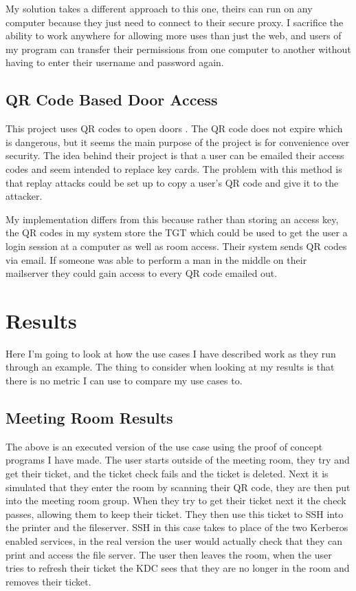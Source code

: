 \documentclass[]{report}   %
\begin{document}
My solution takes a different approach to this one, theirs can run on any computer because they just need to connect to their secure proxy. I sacrifice the ability to work anywhere for allowing more uses than just the web, and users of my program can transfer their permissions from one computer to another without having to enter their username and password again.

\subsection{QR Code Based Door Access}
This project uses QR codes to open doors \cite{QRRelated}. The QR code does not expire which is dangerous, but it seems the main purpose of the project is for convenience over security. The idea behind their project is that a user can be emailed their access codes and seem intended to replace key cards. The problem with this method is that replay attacks could be set up to copy a user's QR code and give it to the attacker.

My implementation differs from this because rather than storing an access key, the QR codes in my system store the TGT which could be used to get the user a login session at a computer as well as room access. Their system sends QR codes via email. If someone was able to perform a man in the middle on their mailserver they could gain access to every QR code emailed out.


\section{Results}
Here I'm going to look at how the use cases I have described work as they run through an example. The thing to consider when looking at my results is that there is no metric I can use to compare my use cases to.

\subsection{Meeting Room Results}

The above is an executed version of the use case using the proof of concept programs I have made. The user starts outside of the meeting room, they try and get their ticket, and the ticket check fails and the ticket is deleted. Next it is simulated that they enter the room by scanning their QR code, they are then put into the meeting room group. When they try to get their ticket next it the check passes, allowing them to keep their ticket. They then use this ticket to SSH into the printer and the fileserver. SSH in this case takes to place of the two Kerberos enabled services, in the real version the user would actually check that they can print and access the file server. The user then leaves the room, when the user tries to refresh their ticket the KDC sees that they are no longer in the room and removes their ticket.
\end{document}
